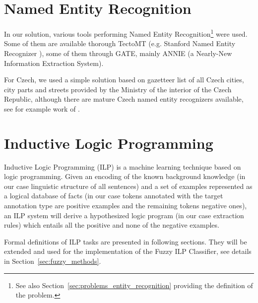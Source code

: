 \section{Named Entity Recognition} \label{sec:third_named_entity_recognition}

In our solution, various tools performing Named Entity Recognition\footnote{See also Section~\ref{sec:problems_entity_recognition} providing the definition of the problem.} were used. Some of them are available thorough TectoMT (e.g. Stanford Named Entity Recognizer \citep{Finkel:2005:INI:1219840.1219885}), some of them through GATE, mainly ANNIE (a Nearly-New Information Extraction System). 

For Czech, we used a simple solution based on gazetteer list of all Czech cities, city parts and streets provided by the Ministry of the interior of the Czech Republic, although there are mature Czech named entity recognizers available, see for example work of \cite{biblio:KrZaCzechNamed2009}.


\section{Inductive Logic Programming} \label{sec:third_ILP}

Inductive Logic Programming (ILP) \citep{biblio:MuggletonILP} is a machine learning technique based on logic programming. Given an encoding of the known background knowledge (in our case linguistic structure of all sentences) and a set of examples represented as a logical database of facts (in our case tokens annotated with the target annotation type are positive examples and the remaining tokens negative ones), an ILP system will derive a hypothesized logic program (in our case extraction rules) which entails all the positive and none of the negative examples.

Formal definitions of ILP tasks are presented in following sections. They will be extended and used for the implementation of the Fuzzy ILP Classifier, see details in Section~\ref{sec:fuzzy_methods}.






